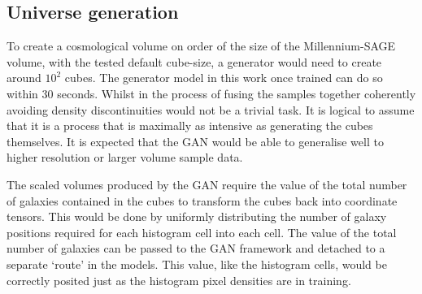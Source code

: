 \documentclass[twocolumn]{article}
\numberwithin{equation}{section}
\begin{document}
\subsection{Universe generation} 
To create a cosmological volume on order of the size of the Millennium-SAGE volume, with the tested default cube-size, a 
generator would need to create around $10^2$ cubes. The generator model in this work once trained can do so within 30 
seconds. Whilst in the process of fusing the samples together coherently avoiding density discontinuities would not be a 
trivial task. It is logical to assume that it is a process that is maximally as intensive as generating the cubes 
themselves. It is expected that the GAN would be able to generalise well to higher resolution or larger volume sample data.  

The scaled volumes produced by the GAN require the value of the total number of galaxies contained in the cubes to 
transform the cubes back into coordinate tensors. This would be done by uniformly distributing the number of galaxy 
positions required for each histogram cell into each cell. The value of the total number of galaxies can be passed to 
the GAN framework and detached to a separate `route' in the models. This value, like the histogram cells, would be 
correctly posited just as the histogram pixel densities are in training. 



\end{document}
